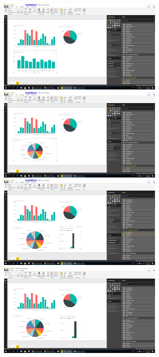 \begin{itemize}
\begin{enumerate}
\includegraphics[width=8cm]{./Imagenes/14.png} \includegraphics[width=8cm]{./Imagenes/15.png}
\includegraphics[width=8cm]{./Imagenes/16.png}\includegraphics[width=8cm]{./Imagenes/17.png}


\end{enumerate}
\end{itemize}
